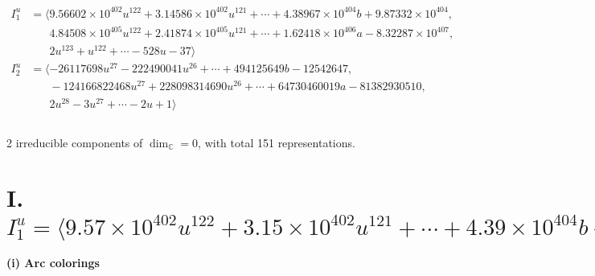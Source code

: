 \documentclass[1p]{elsarticle_modified}
\theoremstyle{definition}
\begin{document}
\begin{align*}
I^u_{1}&=\langle 
9.56602\times10^{402} u^{122}+3.14586\times10^{402} u^{121}+\cdots+4.38967\times10^{404} b+9.87332\times10^{404},\\
\phantom{I^u_{1}}&\phantom{= \langle  }4.84508\times10^{405} u^{122}+2.41874\times10^{405} u^{121}+\cdots+1.62418\times10^{406} a-8.32287\times10^{407},\\
\phantom{I^u_{1}}&\phantom{= \langle  }2 u^{123}+u^{122}+\cdots-528 u-37\rangle \\
I^u_{2}&=\langle 
-26117698 u^{27}-222490041 u^{26}+\cdots+494125649 b-12542647,\\
\phantom{I^u_{2}}&\phantom{= \langle  }-124166822468 u^{27}+228098314690 u^{26}+\cdots+64730460019 a-81382930510,\\
\phantom{I^u_{2}}&\phantom{= \langle  }2 u^{28}-3 u^{27}+\cdots-2 u+1\rangle \\
\\
\end{align*}
\raggedright * 2 irreducible components of $\dim_{\mathbb{C}}=0$, with total 151 representations.\\
\newpage
\renewcommand{\arraystretch}{1}
\centering \section*{I. $I^u_{1}= \langle 9.57\times10^{402} u^{122}+3.15\times10^{402} u^{121}+\cdots+4.39\times10^{404} b+9.87\times10^{404},\;4.85\times10^{405} u^{122}+2.42\times10^{405} u^{121}+\cdots+1.62\times10^{406} a-8.32\times10^{407},\;2 u^{123}+u^{122}+\cdots-528 u-37 \rangle$}
\flushleft \textbf{(i) Arc colorings}\\
\end{document}
